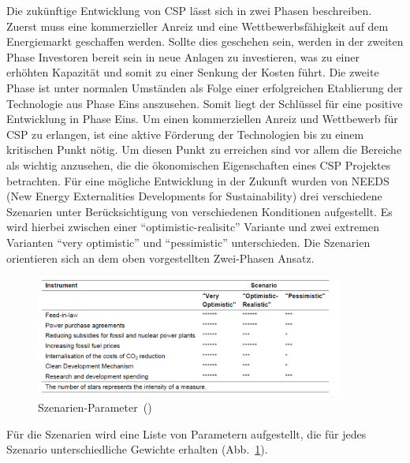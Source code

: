 ﻿Die zukünftige Entwicklung von CSP lässt sich in zwei Phasen beschreiben. Zuerst muss eine kommerzieller Anreiz und eine Wettbewerbsfähigkeit auf dem Energiemarkt geschaffen werden. Sollte dies geschehen sein, werden in der zweiten Phase Investoren bereit sein in neue Anlagen zu investieren, was zu einer erhöhten Kapazität und somit zu einer Senkung der Kosten führt. Die zweite Phase ist unter normalen Umständen als Folge einer erfolgreichen Etablierung der Technologie aus Phase Eins anszusehen. Somit liegt der Schlüssel für eine positive Entwicklung in Phase Eins. Um einen kommerziellen Anreiz und Wettbewerb für CSP zu erlangen, ist eine aktive Förderung der Technologien bis zu einem kritischen Punkt nötig. Um diesen Punkt zu erreichen sind vor allem die Bereiche als wichtig anzusehen, die die ökonomischen Eigenschaften eines CSP Projektes betrachten.
Für eine mögliche Entwicklung in der Zukunft wurden von NEEDS (New Energy Externalities Developments for Sustainability) drei verschiedene Szenarien unter Berücksichtigung von verschiedenen Konditionen aufgestellt. Es wird hierbei zwischen einer "`optimistic-realisitc"' Variante und zwei extremen Varianten "`very optimistic"' und "`pessimistic"' unterschieden. Die Szenarien orientieren sich an dem oben vorgestellten Zwei-Phasen Ansatz.

\begin{figure}[H]
	\centering
	\includegraphics[width=0.9\textwidth,trim=1 1 1 1,clip]{instruments_scenario.png}
	\caption{Szenarien-Parameter~(\cite{viebahn2008})}
	\label{fig:inst}
\end{figure}

Für die Szenarien wird eine Liste von Parametern aufgestellt, die für jedes Szenario unterschiedliche Gewichte erhalten (Abb.~\ref{fig:inst}).

